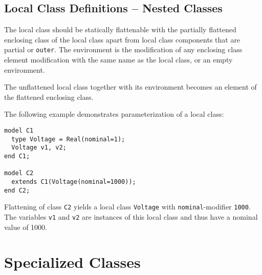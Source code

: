 \subsection{Local Class Definitions -- Nested Classes}\label{local-class-definitions-nested-classes}

The local class should be statically flattenable with the partially
flattened enclosing class of the local class apart from local class
components that are partial or \lstinline!outer!. The environment is the
modification of any enclosing class element modification with the same
name as the local class, or an empty environment.

The unflattened local class together with its environment becomes an
element of the flattened enclosing class.

\begin{example}
The following example demonstrates parameterization of a local class:
\begin{lstlisting}[language=modelica]
model C1
  type Voltage = Real(nominal=1);
  Voltage v1, v2;
end C1;

model C2
  extends C1(Voltage(nominal=1000));
end C2;
\end{lstlisting}

Flattening of class \lstinline!C2! yields a local class \lstinline!Voltage! with
\lstinline!nominal!-modifier \lstinline!1000!. The variables \lstinline!v1! and \lstinline!v2! are
instances of this local class and thus have a nominal value of 1000.
\end{example}

\section{Specialized Classes}\label{specialized-classes}

